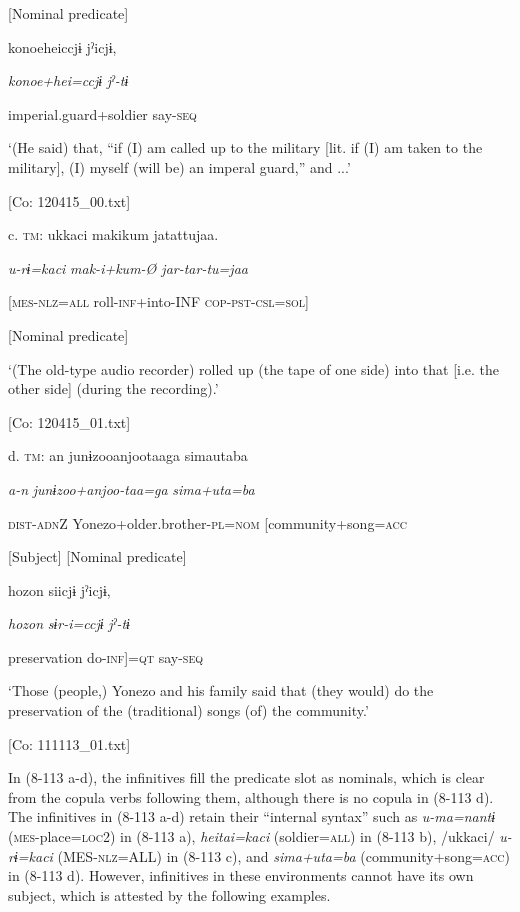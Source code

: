       [Nominal predicate]  

      {\textbar}konoehei{\textbar}ccjɨ  jˀicjɨ,  

      \textit{konoe+hei=ccjɨ}  \textit{jˀ-tɨ}  

      imperial.guard+soldier  say-\textsc{seq}

      ‘(He said) that, “if (I) am called up to the military [lit. if (I) am taken to the military], (I) myself (will be) an imperal guard,” and ...’

      [Co: 120415\_00.txt]

  c.  \textsc{tm}:  ukkaci  makikum  jatattujaa.

      \textit{u-rɨ=kaci}  \textit{mak-i+kum{}-Ø  jar-tar-tu=jaa}

      [\textsc{mes}-\textsc{nlz}=\textsc{all}  roll-\textsc{inf}+into-INF  \textsc{cop}-\textsc{pst}-\textsc{csl}=\textsc{sol}]

      [Nominal predicate]

      ‘(The old-type audio recorder) rolled up (the tape of one side) into that [i.e. the other side] (during the recording).’

      [Co: 120415\_01.txt]

  d.  \textsc{tm}:  an  junɨzooanjootaaga  simautaba

      \textit{a-n}  \textit{junɨzoo+anjoo-taa=ga}  \textit{sima+uta=ba}

      \textsc{dist}-\textsc{adn}Z  Yonezo+older.brother-\textsc{pl}=\textsc{nom}  [community+song=\textsc{acc}

      [Subject]  [Nominal predicate]

      {\textbar}hozon{\textbar}  siicjɨ  jˀicjɨ,

      \textit{hozon}  \textit{sɨr-i=ccjɨ}  \textit{jˀ-tɨ}

      preservation  do-\textsc{inf}]=\textsc{qt}  say-\textsc{seq}

      ‘Those (people,) Yonezo and his family said that (they would) do the preservation of the (traditional) songs (of) the community.’

      [Co: 111113\_01.txt]

In (8-113 a-d), the infinitives fill the predicate slot as nominals, which is clear from the copula verbs following them, although there is no copula in (8-113 d). The infinitives in (8-113 a-d) retain their “internal syntax” \citep{Haspelmath1996} such as \textit{u-ma=nantɨ} (\textsc{mes}-place=\textsc{loc}2) in (8-113 a), \textit{heitai=kaci} (soldier=\textsc{all}) in (8-113 b), /ukkaci/ \textit{u-rɨ=kaci} (MES-\textsc{nlz}=ALL) in (8-113 c), and \textit{sima+uta=ba} (community+song=\textsc{acc}) in (8-113 d). However, infinitives in these environments cannot have its own subject, which is attested by the following examples.

